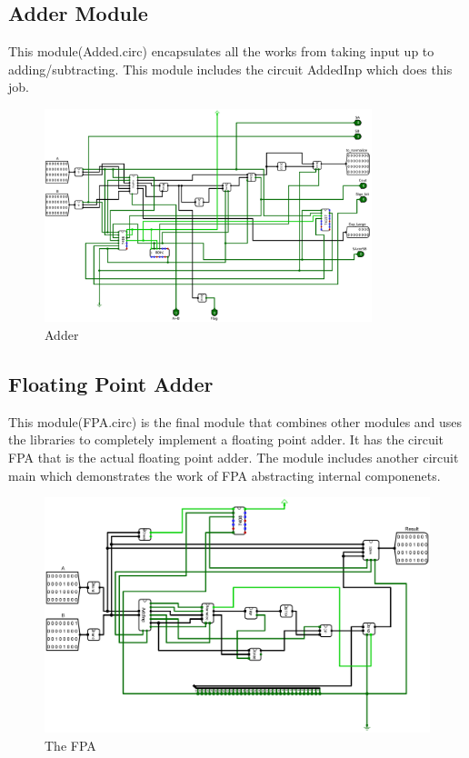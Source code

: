 \documentclass[12pt]{article}
\begin{document}
\newpage
\subsection{Adder Module}
This module(Added.circ) encapsulates all the works from taking input up to adding/subtracting. This module includes the circuit AddedInp which does this job.
\begin{figure}[H]
    \centering
        \includegraphics[width=0.85\textwidth]{Images/AddedInp.png}
    \caption{Adder}\label{fig:adderckt}
\end{figure}



\newpage
\subsection{Floating Point Adder}
This module(FPA.circ) is the final module that combines other modules and uses the libraries to completely implement a floating point adder. It has the circuit FPA that is the actual floating point adder. The module includes another circuit main which demonstrates the work of FPA abstracting internal componenets.
\begin{figure}[H]
    \centering
        \includegraphics[width=\textwidth]{Images/FPA.png}
    \caption{The FPA}\label{fig:fpa}
\end{figure}
\end{document}
